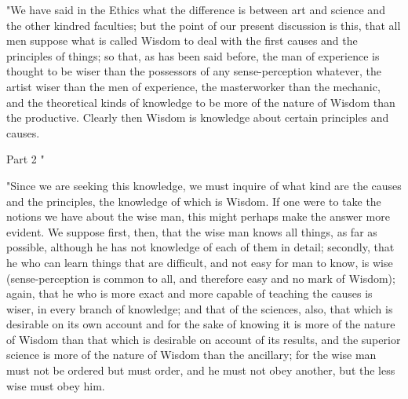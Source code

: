 "We have said in the Ethics what the difference is between art and
science and the other kindred faculties; but the point of our present
discussion is this, that all men suppose what is called Wisdom to
deal with the first causes and the principles of things; so that,
as has been said before, the man of experience is thought to be wiser
than the possessors of any sense-perception whatever, the artist wiser
than the men of experience, the masterworker than the mechanic, and
the theoretical kinds of knowledge to be more of the nature of Wisdom
than the productive. Clearly then Wisdom is knowledge about certain
principles and causes. 

Part 2 "

"Since we are seeking this knowledge, we must inquire of what kind
are the causes and the principles, the knowledge of which is Wisdom.
If one were to take the notions we have about the wise man, this might
perhaps make the answer more evident. We suppose first, then, that
the wise man knows all things, as far as possible, although he has
not knowledge of each of them in detail; secondly, that he who can
learn things that are difficult, and not easy for man to know, is
wise (sense-perception is common to all, and therefore easy and no
mark of Wisdom); again, that he who is more exact and more capable
of teaching the causes is wiser, in every branch of knowledge; and
that of the sciences, also, that which is desirable on its own account
and for the sake of knowing it is more of the nature of Wisdom than
that which is desirable on account of its results, and the superior
science is more of the nature of Wisdom than the ancillary; for the
wise man must not be ordered but must order, and he must not obey
another, but the less wise must obey him. 

